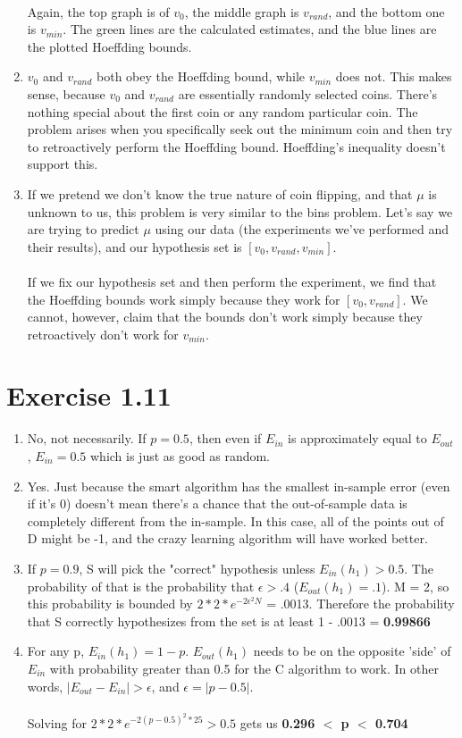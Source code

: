 \documentclass[12pt]{article}
\begin{document}
\begin{enumerate}[label=(\alph*)]
	\\ Again, the top graph is of $v_0$, the middle graph is $v_{rand}$, and the bottom one is $v_{min}$. The green lines are the calculated estimates, and the blue lines are the plotted Hoeffding bounds.
	\item $v_0$ and $v_{rand}$ both obey the Hoeffding bound, while $v_{min}$ does not. This makes sense, because $v_0$ and $v_{rand}$ are essentially randomly selected coins. There's nothing special about the first coin or any random particular coin. The problem arises when you specifically seek out the minimum coin and then try to retroactively perform the Hoeffding bound. Hoeffding's inequality doesn't support this.
	\item If we pretend we don't know the true nature of coin flipping, and that $\mu$ is unknown to us, this problem is very similar to the bins problem. Let's say we are trying to predict $\mu$ using our data (the experiments we've performed and their results), and our hypothesis set is $[v_0, v_{rand}, v_{min}]$.
	\\ \\ If we fix our hypothesis set and then perform the experiment, we find that the Hoeffding bounds work simply because they work for $[v_0, v_{rand}]$. We cannot, however, claim that the bounds don't work simply because they retroactively don't work for $v_{min}$.
\end{enumerate}

\section*{Exercise 1.11}
\begin{enumerate}[label=(\alph*)]
	\item No, not necessarily. If $p = 0.5$, then even if $E_{in}$ is approximately equal to $E_{out}$, $E_{in} = 0.5$ which is just as good as random.
	\item Yes. Just because the smart algorithm has the smallest in-sample error (even if it's 0) doesn't mean there's a chance that the out-of-sample data is completely different from the in-sample. In this case, all of the points out of D might be -1, and the crazy learning algorithm will have worked better.
	\item If $p = 0.9$, S will pick the "correct" hypothesis unless $E_{in}(h_1) > 0.5$. The probability of that is the probability that $\epsilon > .4$ ($E_{out}(h_1) = .1$). M = 2, so this probability is bounded by $2 * 2 * e^{-2\epsilon^2N}$ = .0013. Therefore the probability that S correctly hypothesizes from the set is at least 1 - .0013 = \textbf{0.99866}
	\item For any p, $E_{in}(h_1) = 1 - p$. $E_{out}(h_1)$ needs to be on the opposite 'side' of $E_{in}$ with probability greater than 0.5 for the C algorithm to work. In other words, $|E_{out} - E_{in}| > \epsilon$, and $\epsilon = |p - 0.5|$.
	\\ \\ Solving for $2 * 2 * e^{-2(p - 0.5)^2*25} > 0.5$ gets us \textbf{0.296 $<$ p $<$ 0.704}
\end{enumerate}
\end{document}
